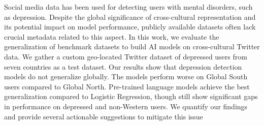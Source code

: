 Social media data has been used for detecting users with mental disorders, such as depression. Despite the global significance of cross-cultural representation and its potential impact on model performance, publicly available datasets often lack crucial metadata related to this aspect. In this work, we evaluate the generalization of benchmark datasets to build AI models on cross-cultural Twitter data. We gather a custom geo-located Twitter dataset of depressed users from seven countries as a test dataset. Our results show that depression detection models do not generalize globally. The models perform worse on Global South users compared to Global North. Pre-trained language models achieve the best generalization compared to Logistic Regression, though still show significant gaps in performance on depressed and non-Western users. We quantify our findings and provide several actionable suggestions to mitigate this issue